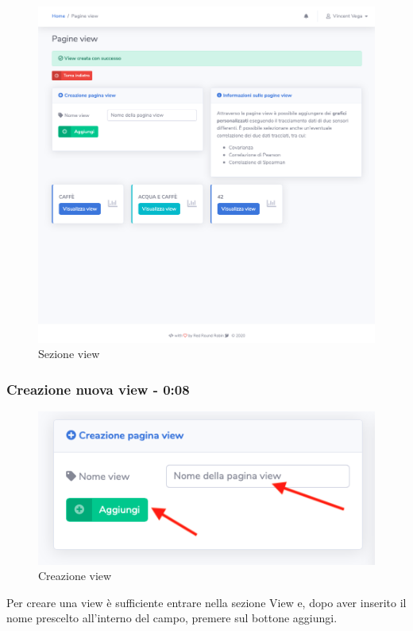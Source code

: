 	\begin{figure}[H]
		\centering
		\includegraphics[scale=0.600]{res/images/membro/view.png}
		\caption{Sezione view}
	\end{figure}

	\subsubsection{Creazione nuova view - 0:08}
	\begin{figure}[H]
		\centering
		\includegraphics[scale=0.600]{res/images/membro/creazView.png}
		\caption{Creazione view}
	\end{figure}

		Per creare una view è sufficiente entrare nella sezione View e, dopo aver inserito il nome prescelto all'interno del campo, premere sul bottone aggiungi.

